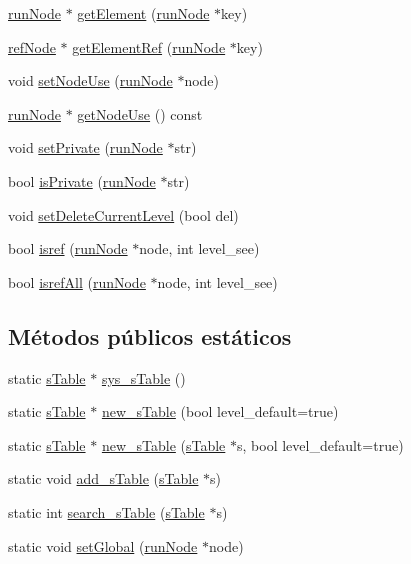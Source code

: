 \begin{DoxyCompactItemize}
\item 
\hyperlink{classrunNode}{run\-Node} $\ast$ \hyperlink{classsTable_a47f0f1fc8f20deb57f350e2eefde9d83}{get\-Element} (\hyperlink{classrunNode}{run\-Node} $\ast$key)
\item 
\hyperlink{classrefNode}{ref\-Node} $\ast$ \hyperlink{classsTable_a8d004fe344c39d0a12b9a31eac88bda6}{get\-Element\-Ref} (\hyperlink{classrunNode}{run\-Node} $\ast$key)
\item 
void \hyperlink{classsTable_acc9ee84140d1aa2f586c2541687b285e}{set\-Node\-Use} (\hyperlink{classrunNode}{run\-Node} $\ast$node)
\item 
\hyperlink{classrunNode}{run\-Node} $\ast$ \hyperlink{classsTable_a97d52825fb8e4571a780b257c082a45e}{get\-Node\-Use} () const 
\item 
void \hyperlink{classsTable_ae592b4a5fa6df887ef21fed0c1cfa587}{set\-Private} (\hyperlink{classrunNode}{run\-Node} $\ast$str)
\item 
bool \hyperlink{classsTable_adefd95f6a1d88c4c180e6c08ce037960}{is\-Private} (\hyperlink{classrunNode}{run\-Node} $\ast$str)
\item 
void \hyperlink{classsTable_adff617e6b26897dbc6131ab37ac171b5}{set\-Delete\-Current\-Level} (bool del)
\item 
bool \hyperlink{classsTable_a02f8d69679f8ead24f9bd28070f707ff}{isref} (\hyperlink{classrunNode}{run\-Node} $\ast$node, int level\-\_\-see)
\item 
bool \hyperlink{classsTable_a58214a193d122d4179a05dc35b8e18ca}{isref\-All} (\hyperlink{classrunNode}{run\-Node} $\ast$node, int level\-\_\-see)
\end{DoxyCompactItemize}
\subsection*{Métodos públicos estáticos}
\begin{DoxyCompactItemize}
\item 
static \hyperlink{classsTable}{s\-Table} $\ast$ \hyperlink{classsTable_ae50e5b871b157a7e303874cab9d1c1e6}{sys\-\_\-s\-Table} ()
\item 
static \hyperlink{classsTable}{s\-Table} $\ast$ \hyperlink{classsTable_a70b8494bbbfce6a36fe142c47f93a2ba}{new\-\_\-s\-Table} (bool level\-\_\-default=true)
\item 
static \hyperlink{classsTable}{s\-Table} $\ast$ \hyperlink{classsTable_aa9e8ad51141bccf1f81d315dcbad8f01}{new\-\_\-s\-Table} (\hyperlink{classsTable}{s\-Table} $\ast$s, bool level\-\_\-default=true)
\item 
static void \hyperlink{classsTable_a46c5b38a9f85db63c323731048798175}{add\-\_\-s\-Table} (\hyperlink{classsTable}{s\-Table} $\ast$s)
\item 
static int \hyperlink{classsTable_a88a04f5451d37ea5b84cb65da081a7de}{search\-\_\-s\-Table} (\hyperlink{classsTable}{s\-Table} $\ast$s)
\item 
static void \hyperlink{classsTable_a1bf90aedd295e313dc5296828bb407d2}{set\-Global} (\hyperlink{classrunNode}{run\-Node} $\ast$node)
\end{DoxyCompactItemize}
